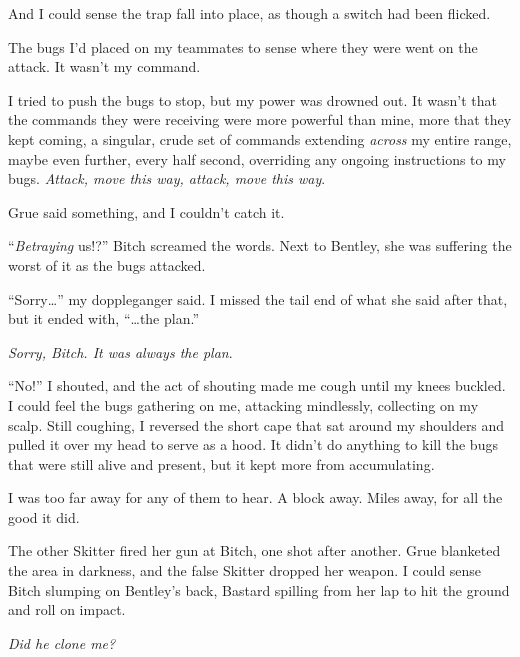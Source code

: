 And I could sense the trap fall into place, as though a switch had been flicked.



The bugs I'd placed on my teammates to sense where they were went on the attack.  It wasn't my command.



I tried to push the bugs to stop, but my power was drowned out.  It wasn't that the commands they were receiving were more powerful than mine, more that they kept coming, a singular, crude set of commands extending \emph{across }my entire range, maybe even further, every half second, overriding any ongoing instructions to my bugs.  \emph{Attack, move this way, attack, move this way}.



Grue said something, and I couldn't catch it.



``\emph{Betraying} us!?'' Bitch screamed the words.  Next to Bentley, she was suffering the worst of it as the bugs attacked.



``Sorry\ldots'' my doppleganger said.  I missed the tail end of what she said after that, but it ended with, ``\ldots{}the plan.''



\emph{Sorry, Bitch.  It was always the plan}.



``No!''  I shouted, and the act of shouting made me cough until my knees buckled.  I could feel the bugs gathering on me, attacking mindlessly, collecting on my scalp.  Still coughing, I reversed the short cape that sat around my shoulders and pulled it over my head to serve as a hood.  It didn't do anything to kill the bugs that were still alive and present, but it kept more from accumulating.



I was too far away for any of them to hear.  A block away.  Miles away, for all the good it did.



The other Skitter fired her gun at Bitch, one shot after another.  Grue blanketed the area in darkness, and the false Skitter dropped her weapon.  I could sense Bitch slumping on Bentley's back, Bastard spilling from her lap to hit the ground and roll on impact.



\emph{Did he clone me?}



